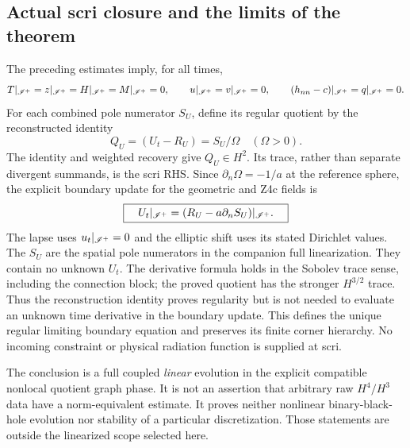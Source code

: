 \subsection{Actual scri closure and the limits of the theorem}
The preceding estimates imply, for all times,
\[
 T|_{\mathscr I^+}=z|_{\mathscr I^+}=H|_{\mathscr I^+}=M|_{\mathscr I^+}=0,\qquad
 u|_{\mathscr I^+}=v|_{\mathscr I^+}=0,\qquad
 (h_{nn}-c)|_{\mathscr I^+}=q|_{\mathscr I^+}=0.
\]
For each combined pole numerator $S_U$, define its regular quotient
by the reconstructed identity
\[
 Q_U=(U_t-R_U)=S_U/\Omega\quad(\Omega>0).
\]
The identity and weighted recovery give $Q_U\in H^2$.
Its trace, rather than separate divergent summands, is the scri RHS.
Since $\partial_n\Omega=-1/a$ at the reference sphere, the explicit
boundary update for the geometric and Z4c fields is
\[
 \boxed{\quad U_t|_{\mathscr I^+}=(R_U-a\partial_nS_U)|_{\mathscr I^+}.\quad}
\]
The lapse uses $u_t|_{\mathscr I^+}=0$ and the elliptic shift uses its stated
Dirichlet values. The $S_U$ are the spatial pole numerators in the
companion full linearization. They contain no unknown $U_t$.
The derivative formula holds in the Sobolev trace sense, including the
connection block; the proved quotient has the stronger $H^{3/2}$ trace.
Thus the reconstruction identity proves regularity but is not needed
to evaluate an unknown time derivative in the boundary update.
This defines the unique regular limiting boundary equation and preserves
its finite corner hierarchy. No incoming constraint or physical radiation
function is supplied at scri.

The conclusion is a full coupled \emph{linear} evolution in the explicit
compatible nonlocal quotient graph phase. It is not an assertion that
arbitrary raw $H^4/H^3$ data have a norm-equivalent estimate.
It proves neither nonlinear binary-black-hole evolution nor stability
of a particular discretization. Those statements are outside the
linearized scope selected here.

